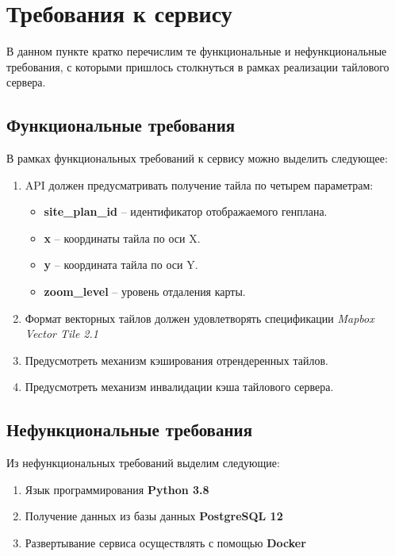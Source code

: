 \section*{\Large{Требования к сервису}}

В данном пункте кратко перечислим те функциональные и нефункциональные требования, с которыми пришлось столкнуться
в рамках реализации тайлового сервера.

\subsection*{\large{Функциональные требования}}

В рамках функциональных требований к сервису можно выделить следующее:
\begin{enumerate}
    \item API должен предусматривать получение тайла по четырем параметрам:
    \begin{itemize}
        \item \textbf{site\_plan\_id} -- идентификатор отображаемого генплана.
        \item \textbf{x} -- координаты тайла по оси X.
        \item \textbf{y} -- координата тайла по оси Y.
        \item \textbf{zoom\_level} -- уровень отдаления карты.
    \end{itemize}
    \item Формат векторных тайлов должен удовлетворять спецификации \textit{Mapbox Vector Tile 2.1}
    \item Предусмотреть механизм кэширования отрендеренных тайлов.
    \item Предусмотреть механизм инвалидации кэша тайлового сервера.
\end{enumerate}

\subsection*{\large{Нефункциональные требования}}

Из нефункциональных требований выделим следующие:
\begin{enumerate}
    \item Язык программирования \textbf{Python 3.8}
    \item Получение данных из базы данных \textbf{PostgreSQL 12}
    \item Развертывание сервиса осуществлять с помощью \textbf{Docker}
\end{enumerate}

